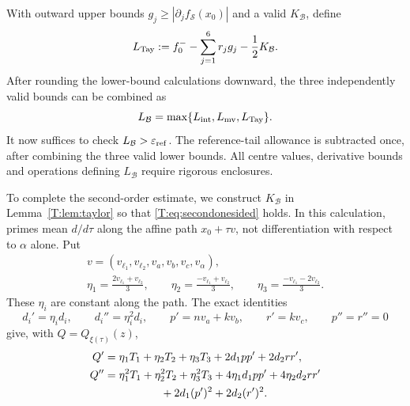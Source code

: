 \documentclass[reqno,english]{amsart}
\theoremstyle{definition}
\newtheorem{open problem}[theorem]{Open Problem}
\theoremstyle{remark}
\theoremstyle{plain}
\numberwithin{equation}{section}
\newcommand{\epsref}{\varepsilon_{\rm ref}}
\begin{document}
With outward upper bounds
$g_j\ge|\partial_jf_{\mathcal S}(x_0)|$ and a valid
$K_{\mathcal B}$, define
\[
 L_{\rm Tay}:=f_0^--\sum_{j=1}^6r_jg_j-\frac12K_{\mathcal B}.
\]
After rounding the lower-bound calculations downward, the three
independently valid bounds can be combined as
\[
 L_{\mathcal B}=\max\{L_{\rm int},L_{\rm mv},L_{\rm Tay}\}.
\]
It now suffices to check $L_{\mathcal B}>\epsref$.
The reference-tail allowance is subtracted once, after combining the
three valid lower bounds. All centre values, derivative bounds and
operations defining $L_{\mathcal B}$ require rigorous enclosures.


To complete the second-order estimate, we construct
$K_{\mathcal B}$ in Lemma~\ref{T:lem:taylor} so that
\eqref{T:eq:secondonesided} holds. In this calculation, primes mean
$d/d\tau$ along the affine path $x_0+\tau v$, not differentiation
with respect to $\alpha$ alone. Put
\[
 \begin{gathered}
 v=(v_{\ell_1},v_{\ell_2},v_a,v_b,v_c,v_\alpha),\\
 \eta_1=\frac{2v_{\ell_1}+v_{\ell_2}}3,\qquad
 \eta_2=\frac{-v_{\ell_1}+v_{\ell_2}}3,\qquad
 \eta_3=\frac{-v_{\ell_1}-2v_{\ell_2}}3.
 \end{gathered}
\]
These $\eta_i$ are constant along the path. The exact identities
\[
 d_i'=\eta_i d_i,\qquad d_i''=\eta_i^2d_i,\qquad
 p'=nv_a+kv_b,\qquad r'=kv_c,\qquad p''=r''=0
\]
give, with $Q=Q_{\xi(\tau)}(z)$,
\begin{align}\label{T:eq:qpath}
 Q'&=\eta_1T_1+\eta_2T_2+\eta_3T_3
       +2d_1pp'+2d_2rr',\notag\\
 Q''&=\eta_1^2T_1+\eta_2^2T_2+\eta_3^2T_3
       +4\eta_1d_1pp'+4\eta_2d_2rr'\\
 &\hspace{18mm}+2d_1(p')^2+2d_2(r')^2.\notag
\end{align}
\end{document}
